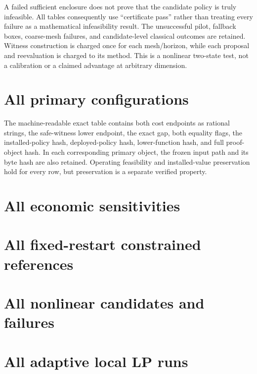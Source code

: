 A failed sufficient enclosure does not prove that the candidate policy is truly infeasible. All tables consequently use ``certificate pass'' rather than treating every failure as a mathematical infeasibility result. The unsuccessful pilot, fallback boxes, coarse-mesh failures, and candidate-level classical outcomes are retained. Witness construction is charged once for each mesh/horizon, while each proposal and reevaluation is charged to its method. This is a nonlinear two-state test, not a calibration or a claimed advantage at arbitrary dimension.

\section{All primary configurations}

The machine-readable exact table contains both cost endpoints as rational strings, the safe-witness lower endpoint, the exact gap, both equality flags, the installed-policy hash, deployed-policy hash, lower-function hash, and full proof-object hash. In each corresponding primary object, the frozen input path and its byte hash are also retained. Operating feasibility and installed-value preservation hold for every row, but preservation is a separate verified property.

\section{All economic sensitivities}


\section{All fixed-restart constrained references}


\section{All nonlinear candidates and failures}


\section{All adaptive local LP runs}


